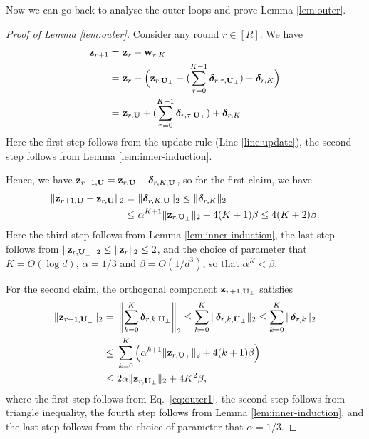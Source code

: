 Now we can go back to analyse the outer loops and prove Lemma \ref{lem:outer}.
\begin{proof}[Proof of Lemma \ref{lem:outer}]
Consider any round $r \in [R]$. We have
\begin{align}
\mathbf{z}_{r+1} = &~ \mathbf{z}_{r} - \mathbf{w}_{r, K} \notag \\
= &~ \mathbf{z}_{r} - \Big( \mathbf{z}_{r, \mathbf{U}_{\perp}} - (\sum_{\tau = 0}^{K-1} \boldsymbol\delta_{r, \tau, \mathbf{U}_{\perp}}) - \boldsymbol\delta_{r, K} \Big) \notag \\
= &~ \mathbf{z}_{r, \mathbf{U}} + (\sum_{\tau = 0}^{K-1} \boldsymbol\delta_{r, \tau, \mathbf{U}_{\perp}}) + \boldsymbol\delta_{r, K} \label{eq:outer1}
\end{align}
Here the first step follows from the update rule (Line \ref{line:update}), the second step follows from Lemma \ref{lem:inner-induction}. 

Hence, we have $\mathbf{z}_{r+1, \mathbf{U}} = \mathbf{z}_{r, \mathbf{U}} + \boldsymbol\delta_{r, K, \mathbf{U}}$, so for the first claim, we have
\begin{align*}
\|\mathbf{z}_{r+1, \mathbf{U}} - \mathbf{z}_{r, \mathbf{U}}\|_2 = &~ \|\boldsymbol\delta_{r, K, \mathbf{U}}\|_2 \leq \|\boldsymbol\delta_{r, K}\|_2\\
\leq &~ \alpha^{K+1}\|\mathbf{z}_{r, \mathbf{U}_\perp}\|_2 + 4(K+1)\beta \leq 4(K+2)\beta.
\end{align*}
Here the third step follows from Lemma \ref{lem:inner-induction}, the last step follows from $\|\mathbf{z}_{r, \mathbf{U}_\perp}\|_2 \leq \|\mathbf{z}_{r}\|_2 \leq 2$, and the choice of parameter that $K = O(\log d)$, $\alpha = 1/3$ and $\beta = O(1/d^3)$, so that $\alpha^K < \beta$.


For the second claim, the orthogonal component $\mathbf{z}_{r+1, \mathbf{U}_\perp}$ satisfies
\begin{align*}
\|\mathbf{z}_{r+1, \mathbf{U}_\perp}\|_2 = &~ \left\|\sum_{k=0}^{K} \boldsymbol\delta_{r, k, \mathbf{U}_\perp}\right\|_2 \leq \sum_{k=0}^{K}\|\boldsymbol\delta_{r, k, \mathbf{U}_\perp}\|_2 \leq \sum_{k=0}^{K}\|\boldsymbol\delta_{r, k}\|_2 \\
\leq &~ \sum_{k=0}^{K} \Big( \alpha^{k+1}\|\mathbf{z}_{r, \mathbf{U}_\perp}\|_2 + 4(k+1) \beta \Big) \\
\leq &~ 2\alpha \|\mathbf{z}_{r, \mathbf{U}_\perp}\|_2 + 4K^2 \beta,
\end{align*}
where the first step follows from Eq.~\eqref{eq:outer1}, the second step follows from triangle inequality, the fourth step follows from Lemma \ref{lem:inner-induction}, and the last step follows from the choice of parameter that $\alpha = 1/3$.



\end{proof}
